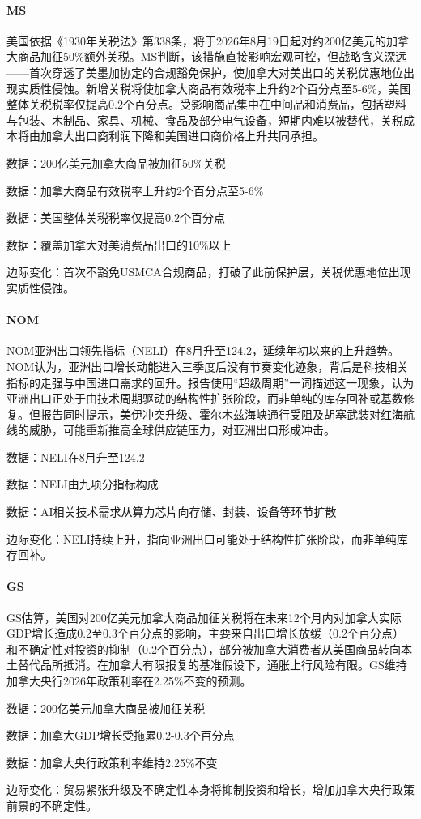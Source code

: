 \documentclass[11pt]{ctexart}
\begin{document}
\paragraph{MS} 美国依据《1930年关税法》第338条，将于2026年8月19日起对约200亿美元的加拿大商品加征50\%额外关税。MS判断，该措施直接影响宏观可控，但战略含义深远——首次穿透了美墨加协定的合规豁免保护，使加拿大对美出口的关税优惠地位出现实质性侵蚀。新增关税将使加拿大商品有效税率上升约2个百分点至5-6\%，美国整体关税税率仅提高0.2个百分点。受影响商品集中在中间品和消费品，包括塑料与包装、木制品、家具、机械、食品及部分电气设备，短期内难以被替代，关税成本将由加拿大出口商利润下降和美国进口商价格上升共同承担。
{\small\color{refgray}数据：200亿美元加拿大商品被加征50\%关税\par}
{\small\color{refgray}数据：加拿大商品有效税率上升约2个百分点至5-6\%\par}
{\small\color{refgray}数据：美国整体关税税率仅提高0.2个百分点\par}
{\small\color{refgray}数据：覆盖加拿大对美消费品出口的10\%以上\par}
{\small\color{refgray}边际变化：首次不豁免USMCA合规商品，打破了此前保护层，关税优惠地位出现实质性侵蚀。\par}
\paragraph{NOM} NOM亚洲出口领先指标（NELI）在8月升至124.2，延续年初以来的上升趋势。NOM认为，亚洲出口增长动能进入三季度后没有节奏变化迹象，背后是科技相关指标的走强与中国进口需求的回升。报告使用“超级周期”一词描述这一现象，认为亚洲出口正处于由技术周期驱动的结构性扩张阶段，而非单纯的库存回补或基数修复。但报告同时提示，美伊冲突升级、霍尔木兹海峡通行受阻及胡塞武装对红海航线的威胁，可能重新推高全球供应链压力，对亚洲出口形成冲击。
{\small\color{refgray}数据：NELI在8月升至124.2\par}
{\small\color{refgray}数据：NELI由九项分指标构成\par}
{\small\color{refgray}数据：AI相关技术需求从算力芯片向存储、封装、设备等环节扩散\par}
{\small\color{refgray}边际变化：NELI持续上升，指向亚洲出口可能处于结构性扩张阶段，而非单纯库存回补。\par}
\paragraph{GS} GS估算，美国对200亿美元加拿大商品加征关税将在未来12个月内对加拿大实际GDP增长造成0.2至0.3个百分点的影响，主要来自出口增长放缓（0.2个百分点）和不确定性对投资的抑制（0.2个百分点），部分被加拿大消费者从美国商品转向本土替代品所抵消。在加拿大有限报复的基准假设下，通胀上行风险有限。GS维持加拿大央行2026年政策利率在2.25\%不变的预测。
{\small\color{refgray}数据：200亿美元加拿大商品被加征关税\par}
{\small\color{refgray}数据：加拿大GDP增长受拖累0.2-0.3个百分点\par}
{\small\color{refgray}数据：加拿大央行政策利率维持2.25\%不变\par}
{\small\color{refgray}边际变化：贸易紧张升级及不确定性本身将抑制投资和增长，增加加拿大央行政策前景的不确定性。\par}
\end{document}
